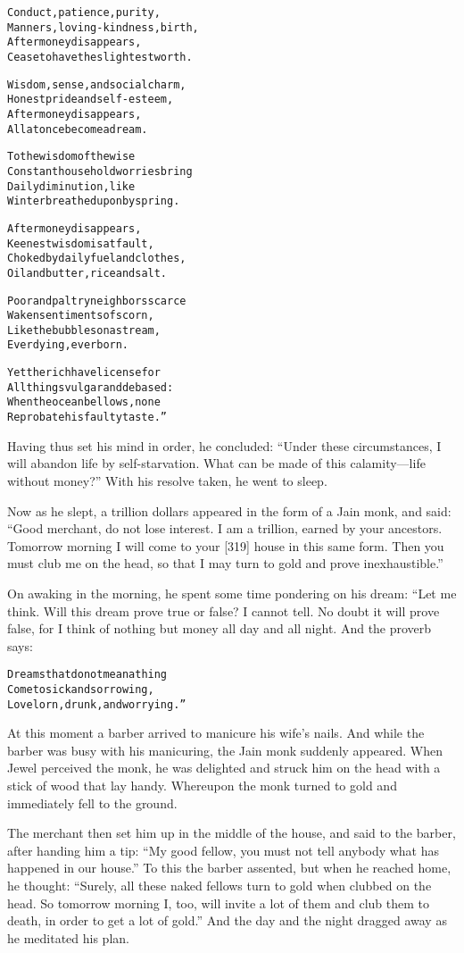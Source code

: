 \documentclass{article}
\renewenvironment{verbatim}{\begin{alltt}\normalfont\begin{centering}}{\end{centering}\end{alltt}}
\begin{document}
\begin{verbatim}
Conduct, patience, purity,
    Manners, loving-kindness, birth,
After money disappears,
    Cease to have the slightest worth.

Wisdom, sense, and social charm,
    Honest pride and self-esteem,
After money disappears,
    All at once become a dream.

To the wisdom of the wise
    Constant household worries bring
Daily diminution, like
    Winter breathed upon by spring.

After money disappears,
    Keenest wisdom is at fault,
Choked by daily fuel and clothes,
    Oil and butter, rice and salt.

Poor and paltry neighbors scarce
    Waken sentiments of scorn,
Like the bubbles on a stream,
    Ever dying, ever born.

Yet the rich have license for
    All things vulgar and debased:
When the ocean bellows, none
    Reprobate his faulty taste.”
\end{verbatim}
Having thus set his mind in order, he concluded:
``Under these circumstances, I will abandon life by self-starvation. What can be made of this calamity---life without money?''
With his resolve taken, he went to sleep.

Now as he slept, a trillion dollars appeared in the form of a Jain
monk, and said:
``Good merchant, do not lose interest. I am a trillion, earned by your ancestors. Tomorrow morning I will come to your [319] house in this same form. Then you must club me on the head, so that I may turn to gold and prove inexhaustible.''

On awaking in the morning, he spent some time pondering on his
dream: “Let me think. Will this dream prove true or false? I cannot
tell. No doubt it will prove false, for I think of nothing but
money all day and all night. And the proverb says:

\begin{verbatim}
Dreams that do not mean a thing
Come to sick and sorrowing,
Lovelorn, drunk, and worrying.”
\end{verbatim}
At this moment a barber arrived to manicure his wife's nails. And
while the barber was busy with his manicuring, the Jain monk
suddenly appeared. When Jewel perceived the monk, he was delighted
and struck him on the head with a stick of wood that lay handy.
Whereupon the monk turned to gold and immediately fell to the
ground.

The merchant then set him up in the middle of the house, and said
to the barber, after handing him a tip:
``My good fellow, you must not tell anybody what has happened in our house.''
To this the barber assented, but when he reached home, he thought:
``Surely, all these naked fellows turn to gold when clubbed on the head. So tomorrow morning I, too, will invite a lot of them and club them to death, in order to get a lot of gold.''
And the day and the night dragged away as he meditated his plan.
\end{document}

